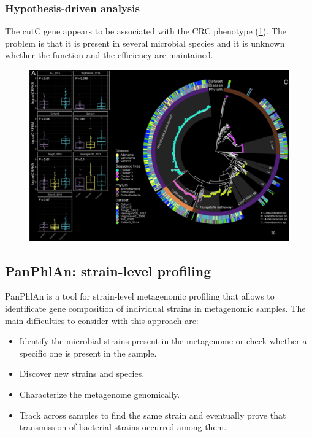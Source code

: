         \subsubsection{Hypothesis-driven analysis}
        The cutC gene appears to be associated with the CRC phenotype (\ref{fig:cutC}).
        The problem is that it is present in several microbial species and it is unknown whether the function and the efficiency are maintained.

        \begin{figure}[H]
            \centering
            \includegraphics[scale=0.2]{cutC.png}
            \caption{\label{fig:cutC}}
        \end{figure}

    \subsection{PanPhlAn: strain-level profiling}
    PanPhlAn is a tool for strain-level metagenomic profiling that allows to identificate gene composition of individual strains in metagenomic samples.
    The main difficulties to consider with this approach are:

    \begin{multicols}{2}
        \begin{itemize}
            \item Identify the microbial strains present in the metagenome or check whether a specific one is present in the sample.
            \item Discover new strains and species.
            \item Characterize the metagenome genomically.
            \item Track across samples to find the same strain and eventually prove that transmission of bacterial strains occurred among them.
        \end{itemize}
    \end{multicols}

